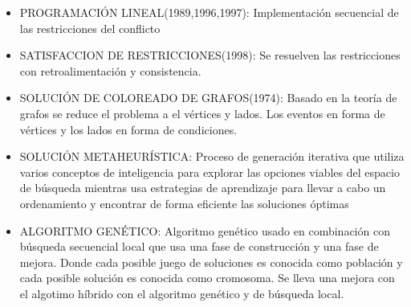 	\begin{itemize}
		
		\item PROGRAMACIÓN LINEAL(1989,1996,1997): Implementación secuencial de las restricciones del conflicto
		
		\item SATISFACCION DE RESTRICCIONES(1998): Se resuelven las restricciones con retroalimentación y consistencia.
		
		\item SOLUCIÓN DE COLOREADO DE GRAFOS(1974): Basado en la teoría de grafos se reduce el problema a el vértices y lados. Los eventos en forma de vértices y los lados en forma de condiciones.
		
		\item SOLUCIÓN METAHEURÍSTICA: Proceso de generación iterativa que utiliza varios conceptos de inteligencia para explorar las opciones viables del espacio de búsqueda mientras usa estrategias de aprendizaje para llevar a cabo un ordenamiento y encontrar de forma eficiente las soluciones óptimas
		
		\item ALGORITMO GENÉTICO: Algoritmo genético usado en combinación con búsqueda secuencial local que usa una fase de construcción y una fase de mejora. Donde cada posible juego de soluciones es conocida como población y cada posible solución es conocida como cromosoma. Se lleva una mejora con el algotimo híbrido con el algoritmo genético y de búsqueda local.
	\end{itemize}
